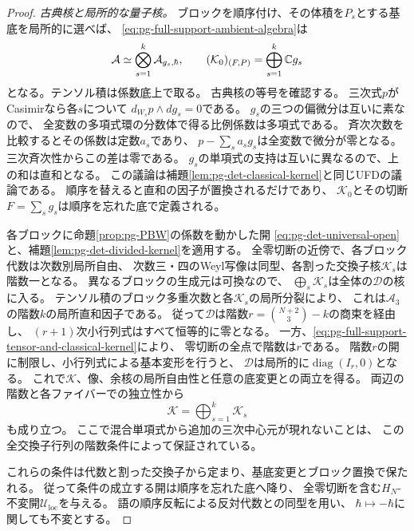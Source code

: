 \begin{proof}
\emph{古典核と局所的な量子核。}
ブロックを順序付け、その体積を$P_s$とする基底を局所的に選べば、
\eqref{eq:pg-full-support-ambient-algebra}は
\begin{equation}
 \mathcal A\simeq\bigotimes_{s=1}^k\mathcal A_{g_s,\hbar},
 \qquad
 (\mathcal K_0)_{(F,P)}=\bigoplus_{s=1}^k\mathbb C g_s
 \label{eq:pg-full-support-tensor-and-classical-kernel}
\end{equation}
となる。テンソル積は係数底上で取る。
古典核の等号を確認する。
三次式$p$がCasimirなら各$s$について
$d_{W_s}p\wedge d g_s=0$である。
$g_s$の三つの偏微分は互いに素なので、
全変数の多項式環の分数体で得る比例係数は多項式である。
斉次次数を比較するとその係数は定数$a_s$であり、
$p-\sum_sa_sg_s$は全変数で微分が零となる。
三次斉次性からこの差は零である。
$g_s$の単項式の支持は互いに異なるので、上の和は直和となる。
この議論は補題\ref{lem:pg-det-classical-kernel}と同じUFDの議論である。
順序を替えると直和の因子が置換されるだけであり、
$\mathcal K_0$とその切断$F=\sum_sg_s$は順序を忘れた底で定義される。

各ブロックに命題\ref{prop:pg-PBW}の係数を動かした開
\eqref{eq:pg-det-universal-open}と、補題\ref{lem:pg-det-divided-kernel}を適用する。
全零切断の近傍で、各ブロック代数は次数別局所自由、
次数三・四のWeyl写像は同型、各割った交換子核$\mathcal K_s$は階数一となる。
異なるブロックの生成元は可換なので、
$\bigoplus_s\mathcal K_s$は全体の$\mathcal D$の核に入る。
テンソル積のブロック多重次数と各$\mathcal K_s$の局所分裂により、
これは$\mathcal A_3$の階数$k$の局所直和因子である。
従って$\mathcal D$は階数$r=\binom{N+2}{3}-k$の商束を経由し、
$(r+1)$次小行列式はすべて恒等的に零となる。
一方、\eqref{eq:pg-full-support-tensor-and-classical-kernel}により、
零切断の全点で階数は$r$である。
階数$r$の開に制限し、小行列式による基本変形を行うと、
$\mathcal D$は局所的に$\operatorname{diag}(I_r,0)$となる。
これで$\mathcal K$、像、余核の局所自由性と任意の底変更との両立を得る。
両辺の階数と各ファイバーでの独立性から
\begin{equation}
 \mathcal K=\bigoplus_{s=1}^k\mathcal K_s
 \label{eq:pg-full-support-quantum-kernel-sum}
\end{equation}
も成り立つ。
ここで混合単項式から追加の三次中心元が現れないことは、
この全交換子行列の階数条件によって保証されている。

これらの条件は代数と割った交換子から定まり、基底変更とブロック置換で保たれる。
従って条件の成立する開は順序を忘れた底へ降り、
全零切断を含む$H_N$-不変開$\mathcal U_{\mathrm{loc}}$を与える。
語の順序反転による反対代数との同型を用い、
$\hbar\mapsto-\hbar$に関しても不変とする。


\end{proof}
